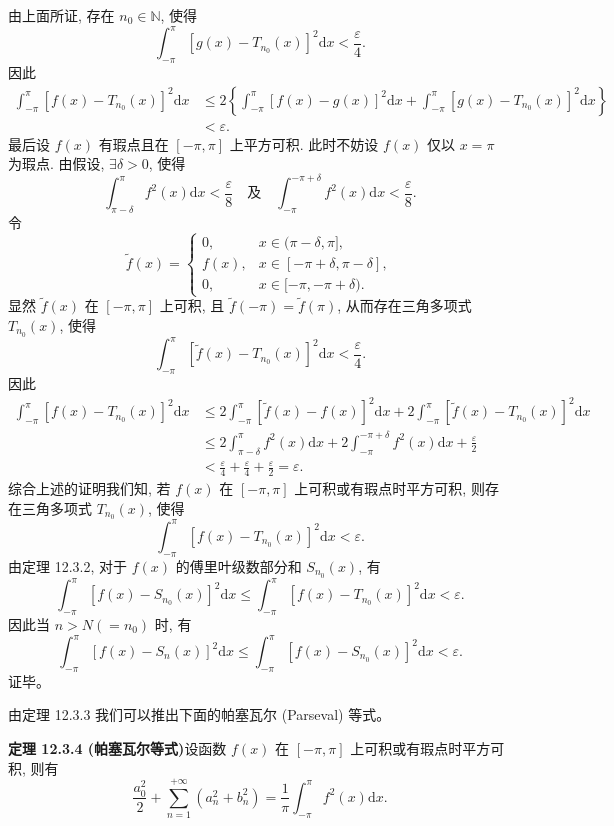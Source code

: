 \documentclass[UTF8, 12pt, fontset=fandol, oneside]{ctexart}
\begin{document}
由上面所证, 存在 $n_0\in\mathbb N$, 使得
\[
  \int_{-\pi}^{\pi}[g(x)-T_{n_0}(x)]^2\mathrm dx<\frac{\varepsilon}{4}.
\]
因此
\[
\begin{aligned}
  \int_{-\pi}^{\pi}[f(x)-T_{n_0}(x)]^2\mathrm dx
  &\leqslant
  2\left\{
    \int_{-\pi}^{\pi}[f(x)-g(x)]^2\mathrm dx
    +\int_{-\pi}^{\pi}[g(x)-T_{n_0}(x)]^2\mathrm dx
  \right\}\\
  &<\varepsilon.
\end{aligned}
\]
最后设 $f(x)$ 有瑕点且在 $[-\pi,\pi]$ 上平方可积. 此时不妨设 $f(x)$ 仅以 $x=\pi$ 为瑕点. 由假设, $\exists\delta>0$, 使得
\[
  \int_{\pi-\delta}^{\pi}f^2(x)\mathrm dx<\frac{\varepsilon}{8}
  \quad\text{及}\quad
  \int_{-\pi}^{-\pi+\delta}f^2(x)\mathrm dx<\frac{\varepsilon}{8}.
\]
令
\[
  \widetilde f(x)=
  \begin{cases}
    0, & x\in(\pi-\delta,\pi],\\
    f(x), & x\in[-\pi+\delta,\pi-\delta],\\
    0, & x\in[-\pi,-\pi+\delta).
  \end{cases}
\]
显然 $\widetilde f(x)$ 在 $[-\pi,\pi]$ 上可积, 且 $\widetilde f(-\pi)=\widetilde f(\pi)$, 从而存在三角多项式 $T_{n_0}(x)$, 使得
\[
  \int_{-\pi}^{\pi}[\widetilde f(x)-T_{n_0}(x)]^2\mathrm dx<\frac{\varepsilon}{4}.
\]
因此
\[
\begin{aligned}
  \int_{-\pi}^{\pi}[f(x)-T_{n_0}(x)]^2\mathrm dx
  &\leqslant
  2\int_{-\pi}^{\pi}[\widetilde f(x)-f(x)]^2\mathrm dx
  +2\int_{-\pi}^{\pi}[\widetilde f(x)-T_{n_0}(x)]^2\mathrm dx\\
  &\leqslant
  2\int_{\pi-\delta}^{\pi}f^2(x)\mathrm dx
  +2\int_{-\pi}^{-\pi+\delta}f^2(x)\mathrm dx
  +\frac{\varepsilon}{2}\\
  &<\frac{\varepsilon}{4}+\frac{\varepsilon}{4}+\frac{\varepsilon}{2}
  =\varepsilon.
\end{aligned}
\]
综合上述的证明我们知, 若 $f(x)$ 在 $[-\pi,\pi]$ 上可积或有瑕点时平方可积, 则存在三角多项式 $T_{n_0}(x)$, 使得
\[
  \int_{-\pi}^{\pi}[f(x)-T_{n_0}(x)]^2\mathrm dx<\varepsilon.
\]
由定理 12.3.2, 对于 $f(x)$ 的傅里叶级数部分和 $S_{n_0}(x)$, 有
\[
  \int_{-\pi}^{\pi}[f(x)-S_{n_0}(x)]^2\mathrm dx
  \leqslant
  \int_{-\pi}^{\pi}[f(x)-T_{n_0}(x)]^2\mathrm dx<\varepsilon.
\]
因此当 $n>N(=n_0)$ 时, 有
\[
  \int_{-\pi}^{\pi}[f(x)-S_n(x)]^2\mathrm dx
  \leqslant
  \int_{-\pi}^{\pi}[f(x)-S_{n_0}(x)]^2\mathrm dx<\varepsilon.
\]
证毕。

由定理 12.3.3 我们可以推出下面的帕塞瓦尔 (Parseval) 等式。

\noindent\textbf{定理 12.3.4 (帕塞瓦尔等式)}\quad 设函数 $f(x)$ 在 $[-\pi,\pi]$ 上可积或有瑕点时平方可积, 则有
\[
  \frac{a_0^2}{2}+\sum_{n=1}^{+\infty}(a_n^2+b_n^2)
  =
  \frac1\pi\int_{-\pi}^{\pi}f^2(x)\mathrm dx.
\]
\end{document}
